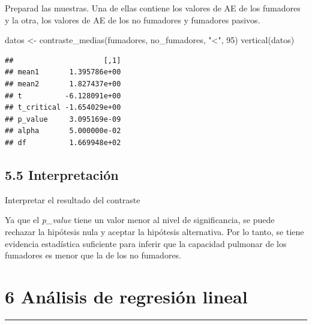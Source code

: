 \documentclass[
]{article}
\newenvironment{Shaded}{\begin{snugshade}}{\end{snugshade}}
\newcommand{\DecValTok}[1]{\textcolor[rgb]{0.00,0.00,0.81}{#1}}
\newcommand{\FunctionTok}[1]{\textcolor[rgb]{0.00,0.00,0.00}{#1}}
\newcommand{\NormalTok}[1]{#1}
\newcommand{\OtherTok}[1]{\textcolor[rgb]{0.56,0.35,0.01}{#1}}
\newcommand{\StringTok}[1]{\textcolor[rgb]{0.31,0.60,0.02}{#1}}
\begin{document}
Preparad las muestras. Una de ellas contiene los valores de AE de los
fumadores y la otra, los valores de AE de los no fumadores y fumadores
pasivos.

\vspace{0.3cm}

\begin{Shaded}
\begin{Highlighting}[]
\NormalTok{datos }\OtherTok{\textless{}{-}} \FunctionTok{contraste\_medias}\NormalTok{(fumadores, no\_fumadores, }\StringTok{"\textless{}"}\NormalTok{, }\DecValTok{95}\NormalTok{)}
\FunctionTok{vertical}\NormalTok{(datos)}
\end{Highlighting}
\end{Shaded}

\begin{verbatim}
##                     [,1]
## mean1       1.395786e+00
## mean2       1.827437e+00
## t          -6.128091e+00
## t_critical -1.654029e+00
## p_value     3.095169e-09
## alpha       5.000000e-02
## df          1.669948e+02
\end{verbatim}

\vspace{0.3cm}

\hypertarget{interpretaciuxf3n}{%
\subsection{5.5 Interpretación}\label{interpretaciuxf3n}}

Interpretar el resultado del contraste

\vspace{0.3cm}

Ya que el \emph{p\_value} tiene un valor menor al nivel de
significancia, se puede rechazar la hipótesis nula y aceptar la
hipótesis alternativa. Por lo tanto, se tiene evidencia estadística
suficiente para inferir que la capacidad pulmonar de los fumadores es
menor que la de los no fumadores.

\newpage

\hypertarget{anuxe1lisis-de-regresiuxf3n-lineal}{%
\section{6 Análisis de regresión
lineal}\label{anuxe1lisis-de-regresiuxf3n-lineal}}

\begin{center}\rule{0.5\linewidth}{0.5pt}\end{center}
\end{document}
